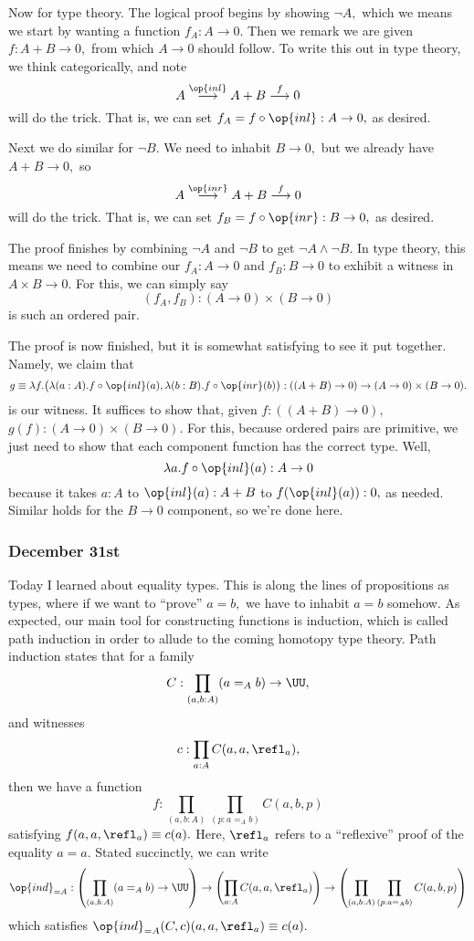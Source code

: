 Now for type theory. The logical proof begins by showing $\lnot A,$ which we means we start by wanting a function $f_A:A\to0.$ Then we remark we are given $f:A+B\to0,$ from which $A\to0$ should follow. To write this out in type theory, we think categorically, and note
\[A\stackrel{\op{inl}}\longrightarrow A+B\stackrel f\longrightarrow0\]
will do the trick. That is, we can set $f_A=f\circ\op{inl}:A\to0,$ as desired.

Next we do similar for $\lnot B.$ We need to inhabit $B\to0,$ but we already have $A+B\to0,$ so
\[A\stackrel{\op{inr}}\longrightarrow A+B\stackrel f\longrightarrow0\]
will do the trick. That is, we can set $f_B=f\circ\op{inr}:B\to0,$ as desired.

The proof finishes by combining $\lnot A$ and $\lnot B$ to get $\lnot A\land\lnot B.$ In type theory, this means we need to combine our $f_A:A\to0$ and $f_B:B\to0$ to exhibit a witness in $A\times B\to0.$ For this, we can simply say
\[(f_A,f_B):(A\to0)\times(B\to0)\]
is such an ordered pair.

The proof is now finished, but it is somewhat satisfying to see it put together. Namely, we claim that
\[g\equiv\lambda f.\big(\lambda(a:A).f\circ\op{inl}(a),\lambda(b:B).f\circ\op{inr}(b)\big):((A+B)\to0)\to(A\to0)\times(B\to0).\]
is our witness. It suffices to show that, given $f:((A+B)\to0),$ $g(f):(A\to0)\times(B\to0).$ For this, because ordered pairs are primitive, we just need to show that each component function has the correct type. Well,
\[\lambda a.f\circ\op{inl}(a):A\to0\]
because it takes $a:A$ to $\op{inl}(a):A+B$ to $f(\op{inl}(a)):0,$ as needed. Similar holds for the $B\to0$ component, so we're done here.

\subsubsection{December 31st}
Today I learned about equality types. This is along the lines of propositions as types, where if we want to ``prove'' $a=b,$ we have to inhabit $a=b$ somehow. As expected, our main tool for constructing functions is induction, which is called path induction in order to allude to the coming homotopy type theory. Path induction states that for a family
\[C:\prod_{(a,b:A)}(a=_Ab)\to\UU,\]
and witnesses
\[c:\prod_{a:A}C(a,a,\refl_a),\]
then we have a function
\[f:\prod_{(a,b:A)}\prod_{(p:a=_Ab)}C(a,b,p)\]
satisfying $f(a,a,\refl_a)\equiv c(a).$ Here, $\refl_a$ refers to a ``reflexive'' proof of the equality $a=a.$ Stated succinctly, we can write
\[\op{ind}_{=A}:\left(\prod_{(a,b:A)}(a=_Ab)\to\UU\right)\to\left(\prod_{a:A}C(a,a,\refl_a)\right)\to\left(\prod_{(a,b:A)}\prod_{(p:a=_Ab)}C(a,b,p)\right)\]
which satisfies $\op{ind}_{=A}(C,c)(a,a,\refl_a)\equiv c(a).$

